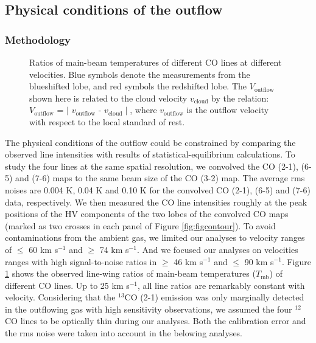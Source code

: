 \subsection{Physical conditions of the outflow}
\subsubsection{Methodology}

\begin{figure}[tbp]
\caption{Ratios of main-beam temperatures of different CO lines at different velocities. Blue symbols denote the measurements from the blueshifted lobe, and red symbols the redshifted lobe. The $V_{\mathrm{outflow}}$ shown here is related to the cloud velocity $v_{\mathrm{cloud}}$ by the relation: $V_{\mathrm{outflow}}$ = $\mid$ $v_{\mathrm{outflow}}$ - $v_{\mathrm{cloud}}\mid$, where $v_{\mathrm{outflow}}$ is the outflow velocity with respect to the local standard of rest. \label{fig:figratio}}
\end{figure}

The physical conditions of the outflow could be constrained by comparing the observed line intensities with results of statistical-equilibrium calculations. To study the four lines at the same spatial resolution, we convolved the CO (2-1), (6-5) and (7-6) maps to the same beam size of the CO (3-2) map. The average rms noises are 0.004 K, 0.04 K and 0.10 K for the convolved CO (2-1), (6-5) and (7-6) data, respectively. We then measured the CO line intensities roughly at the peak positions of the HV components of the two lobes of the convolved CO maps (marked as two crosses in each panel of Figure \ref{fig:figcontour}).  To avoid contaminations from the ambient gas, we limited our analyses to velocity ranges of $\le$ 60 km s$^{-1}$ and $\ge$ 74 km s$^{-1}$. And we focused our analyses on velocities ranges with high signal-to-noise ratios in $\ge$ 46 km s$^{-1}$ and $\le$ 90 km s$^{-1}$. Figure \ref{fig:figratio} shows the observed line-wing ratios of main-beam temperatures ($T_{\mathrm{mb}}$) of different CO lines.  Up to 25 km s$^{-1}$, all line ratios are remarkably constant with velocity. Considering that the $^{13}$CO (2-1) emission was only marginally detected in the outflowing gas with high sensitivity observations\citep{2009ApJ...696...66Q}, we assumed the four $^{12}$CO lines to be optically thin during our analyses. Both the calibration error and the rms noise were taken into account in the belowing analyses.

